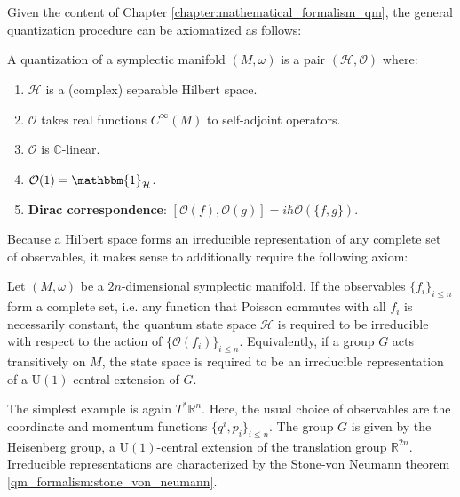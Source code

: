 \chapter{}\label{chapter:quantization}

    Given the content of Chapter \ref{chapter:mathematical_formalism_qm}, the general quantization procedure can be axiomatized as follows:

    \begin{method}\label{quantization:axioms}
        A quantization of a symplectic manifold $(M,\omega)$ is a pair $(\mathcal{H},\mathcal{O})$ where:
        \begin{enumerate}
            \item $\mathcal{H}$ is a (complex) separable Hilbert space.
            \item $\mathcal{O}$ takes real functions $C^\infty(M)$ to self-adjoint operators.
            \item $\mathcal{O}$ is $\mathbb{C}$-linear.
            \item $\mathcal{O}(1) = \mathbbm{1}_{\mathcal{H}}$.
            \item \textbf{Dirac correspondence}: $[\mathcal{O}(f),\mathcal{O}(g)] = i\hbar\mathcal{O}(\{f,g\})$.
        \end{enumerate}
    \end{method}

    Because a Hilbert space forms an irreducible representation of any complete set of observables, it makes sense to additionally require the following axiom:
    \begin{axiom}
        Let $(M,\omega)$ be a $2n$-dimensional symplectic manifold. If the observables $\{f_i\}_{i\leq n}$ form a complete set, i.e. any function that Poisson commutes with all $f_i$ is necessarily constant, the quantum state space $\mathcal{H}$ is required to be irreducible with respect to the action of $\{\mathcal{O}(f_i)\}_{i\leq n}$. Equivalently, if a group $G$ acts transitively on $M$, the state space is required to be an irreducible representation of a $\text{U}(1)$-central extension of $G$.
    \end{axiom}
    The simplest example is again $T^*\mathbb{R}^n$. Here, the usual choice of observables are the coordinate and momentum functions $\{q^i,p_i\}_{i\leq n}$. The group $G$ is given by the Heisenberg group, a $\text{U}(1)$-central extension of the translation group $\mathbb{R}^{2n}$. Irreducible representations are characterized by the Stone-von Neumann theorem \ref{qm_formalism:stone_von_neumann}.

